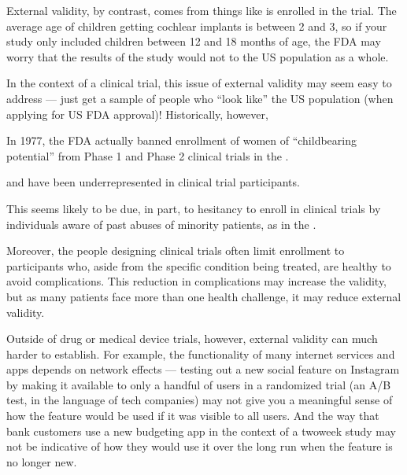 \documentclass[letterpaper,10pt,english]{jupyterBook}
\begin{document}
\sphinxAtStartPar
External validity, by contrast, comes from things like  is enrolled in the trial. The average age of children getting cochlear implants is between 2 and 3, so if your study only included children between 12 and 18 months of age, the FDA may worry that the results of the study would not  to the US population as a whole.

\sphinxAtStartPar
In the context of a clinical trial, this issue of external validity may seem easy to address — just get a sample of people who “look like” the US population (when applying for US FDA approval)! Historically, however, %
\begin{footnote}[1]\sphinxAtStartFootnote
In 1977, the FDA actually banned enrollment of women of “childbearing potential” from Phase 1 and Phase 2 clinical trials in the .
%
\end{footnote} and  have been underrepresented in clinical trial participants.%
\begin{footnote}[2]\sphinxAtStartFootnote
This seems likely to be due, in part, to hesitancy to enroll in clinical trials by individuals aware of past abuses of minority patients, as in the .
%
\end{footnote} Moreover, the people designing clinical trials often limit enrollment to participants who, aside from the specific condition being treated, are healthy to avoid complications. This reduction in complications may increase the  validity, but as many patients face more than one health challenge, it may reduce external validity.

\sphinxAtStartPar
Outside of drug or medical device trials, however, external validity can much harder to establish. For example, the functionality of many internet services and apps depends on network effects — testing out a new social feature on Instagram by making it available to only a handful of users in a randomized trial (an A/B test, in the language of tech companies) may not give you a meaningful sense of how the feature would be used if it was visible to all users. And the way that bank customers use a new budgeting app in the context of a two\sphinxhyphen{}week study may not be indicative of how they would use it over the long run when the feature is no longer new.
\end{document}
